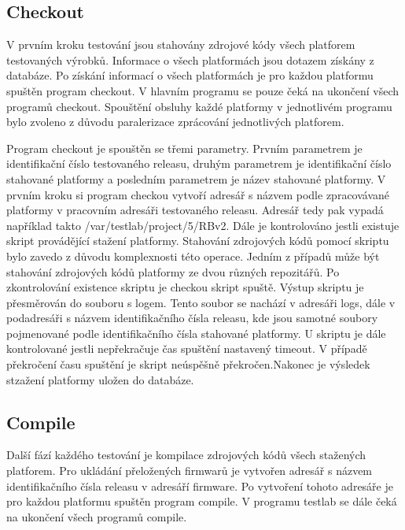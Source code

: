 \subsection{Checkout}
V prvním kroku testování jsou stahovány zdrojové kódy všech platforem testovaných výrobků. Informace o všech platformách jsou dotazem získány z databáze. Po získání informací o všech platformách je pro každou platformu spuštěn program checkout. V hlavním programu se pouze čeká na ukončení všech programů checkout. Spouštění obsluhy každé platformy v jednotlivém programu bylo zvoleno z důvodu paralerizace zprácování jednotlivých platforem.

Program checkout je spouštěn se třemi parametry. Prvním parametrem je identifikační číslo testovaného releasu, druhým parametrem je identifikační číslo stahované platformy a posledním parametrem je název stahované platformy. V prvním kroku si program checkou vytvoří adresář s názvem podle zpracovávané platformy v pracovním adresáři testovaného releasu. Adresář tedy pak vypadá například takto /var/testlab/project/5/RBv2. Dále je kontrolováno jestli existuje skript provádějící stažení platformy. Stahování zdrojových kódů pomocí skriptu bylo zavedo z důvodu komplexnosti této operace. Jedním z případů může být stahování zdrojových kódů platformy ze dvou různých repozitářů. Po zkontrolování existence skriptu je checkou skript spuště. Výstup skriptu je přesměrován do souboru s logem. Tento soubor se nachází v adresáři logs, dále v podadresáři s názvem identifikačního čísla releasu, kde jsou samotné soubory pojmenované podle identifikačního čísla stahované platformy. U skriptu je dále kontrolované jestli nepřekračuje čas spuštění nastavený timeout. V případě překročení času spuštění je skript neúspěšně překročen.Nakonec je výsledek stzažení platformy uložen do databáze.

\subsection{Compile}
Další fází každého testování je kompilace zdrojových kódů všech stažených platforem. Pro ukládání přeložených firmwarů je vytvořen adresář s názvem identifikačního čísla releasu v adresáří firmware. Po vytvoření tohoto adresáře je pro každou platformu spuštěn program compile. V programu testlab se dále čeká na ukončení všech programů compile.

